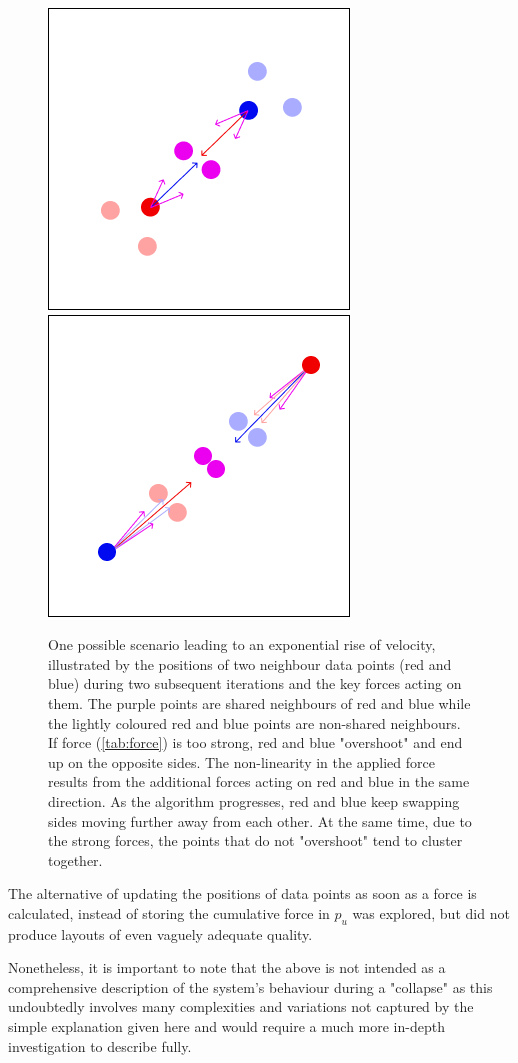 \documentclass{l4proj}
\begin{document}
\begin{figure}
\centering
    \includegraphics[height=0.4\textwidth]{images/collapse/Iteration 1 (1).png}
    \includegraphics[height = 0.4\textwidth]{images/collapse/Iteration 2.png}

    \caption{One possible scenario leading to an exponential rise of velocity, illustrated by the positions of two neighbour data points (red and blue)  during two subsequent iterations and the key forces acting on them. The purple points are shared neighbours of red and blue while the lightly coloured red and blue points are non-shared neighbours. If force (\ref{tab:force}) is too strong, red and blue "overshoot" and end up on the opposite sides. The non-linearity in the applied force results from the additional forces acting on red and blue in the same direction. As the algorithm progresses, red and blue keep swapping sides moving further away from each other. At the same time, due to the strong forces, the points that do not "overshoot" tend to cluster together.}
    \label{fig:overshooting}
\end{figure}
The alternative of updating the positions of data points as soon as a force is calculated, instead of storing the cumulative force in $p_{u}$ was explored, but did not produce layouts of even vaguely adequate quality.

Nonetheless, it is important to note that the above is not intended as a comprehensive description of the system's behaviour during a "collapse" as this undoubtedly involves many complexities and variations not captured by the simple explanation given here and would require a much more in-depth investigation to describe fully.
\end{document}
